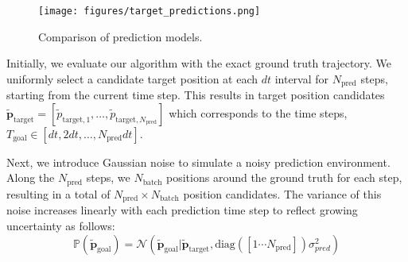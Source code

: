 \begin{figure}[]
    \centering
    \texttt{[image: figures/target\_predictions.png]}
    \caption{Comparison of prediction models.}
    \label{fig:compare_pred}
    \vspace{-1\baselineskip}
\end{figure}

Initially, we evaluate our algorithm with the exact ground truth trajectory. 
We uniformly select a candidate target position at each $dt$ interval for $N_\text{pred}$ steps, starting from the current time step.
This results in target position candidates $\tilde{\mathbf{p}}_{\text{target}} =[\tilde p_{\text{target}, 1}, \dots, \tilde p_{\text{target}, N_\text{pred}}]$ which corresponds to the time steps, $T_\text{goal} \in [dt, 2dt, \dots, N_\text{pred}dt]$.

Next, we introduce Gaussian noise to simulate a noisy prediction environment. 
Along the $N_\text{pred}$ steps, we $N_\text{batch}$ positions around the ground truth for each step, resulting in a total of $N_\text{pred} \times N_\text{batch}$ position candidates.
The variance of this noise increases linearly with each prediction time step to reflect growing uncertainty as follows:
\begin{equation}
    \mathbb{P}(\tilde{\mathbf{p}}_{\text{goal}}) = \mathcal{N}(\tilde{\mathbf{p}}_{\text{goal}} | \tilde{\mathbf{p}}_{\text{target}}, \text{diag}([1 \cdots N_\text{pred}]) \sigma_{pred}^2)
\end{equation}

